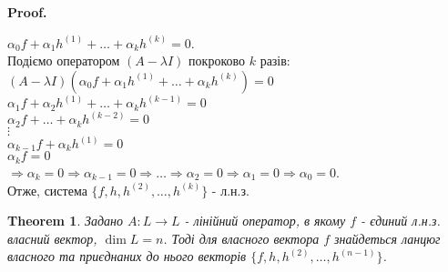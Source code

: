 \documentclass[a4paper, 10pt]{article}
\makeatletter
\theoremstyle{theoremdd}
\newtheorem{theorem}{Theorem}[subsection]
\renewenvironment{proof}[1][Proof.\\]{\par
\pushQED{\hfill \qed}%
\normalfont \topsep6\p@\@plus6\p@\relax
\trivlist
\item\relax
{\bfseries
#1\@addpunct{.}}\hspace\labelsep\ignorespaces
}{%
\popQED\endtrivlist\@endpefalse
}
\makeatother
\begin{document}
\begin{proof}
$\alpha_0 f + \alpha_1 h^{(1)} + \dots + \alpha_k h^{(k)} = 0$.\\
Подіємо оператором $(A-\lambda I)$ покроково $k$ разів:\\
$(A-\lambda I)(\alpha_0 f + \alpha_1 h^{(1)} + \dots + \alpha_k h^{(k)}) = 0$\\
$\alpha_1 f + \alpha_2 h^{(1)} + \dots + \alpha_k h^{(k-1)} = 0$\\
$\alpha_2 f + \dots + \alpha_k h^{(k-2)} = 0$\\
$\vdots$\\
$\alpha_{k-1} f + \alpha_k h^{(1)} = 0$\\
$\alpha_k f = 0$\\
$\Rightarrow \alpha_k = 0 \Rightarrow \alpha_{k-1} = 0 \Rightarrow \dots \Rightarrow \alpha_2 = 0 \Rightarrow \alpha_1 = 0 \Rightarrow \alpha_0 = 0$.\\
Отже, система $\{f,h,h^{(2)},\dots,h^{(k)}\}$ - л.н.з.
\end{proof}

\begin{theorem}
Задано $A: L \to L$ - лінійний оператор, в якому $f$ - єдиний л.н.з. власний вектор, $\dim L = n$. Тоді для власного вектора $f$ знайдеться ланцюг власного та приєднаних до нього векторів $\{f,h,h^{(2)},\dots,h^{(n-1)}\}$.
\end{theorem}
\end{document}
